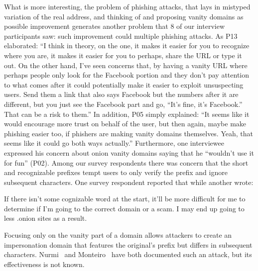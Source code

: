 What is more interesting, the problem of phishing attacks, that lays in mistyped variation of the real address, and thinking of and proposing vanity domains as possible improvement generates another problem that 8 of our interview participants saw: such improvement could multiple phishing attacks. As P13 elaborated: ``I think in theory, on the one, it makes it easier for you to recognize where you are, it makes it easier for you to perhaps, share the URL or type it out. On the other hand, I've seen concerns that, by having a vanity URL where perhaps people only look for the Facebook portion and they don't pay attention to what comes after it could potentially make it easier to exploit unsuspecting users. Send them a link that also says Facebook but the numbers after it are different, but you just see the Facebook part and go, ``It's fine, it's Facebook.'' That can be a risk to them.''  In addition, P05 simply explained:  ``It seems like it would encourage more trust on behalf of the user, but then again, maybe make phishing easier too, if phishers are making vanity domains themselves. Yeah, that seems like it could go both ways actually.'' Furthermore, one interviewee expressed his concern about onion vanity domains saying that he ``wouldn’t use it for fun'' (P02).
Among our survey respondents there was concern that the
short and recognizable prefixes tempt users to only verify the prefix and ignore
subsequent characters.  One survey respondent reported that   while another wrote:

\begin{displayquote}
If there isn't some cognizable word at the start, it'll be more difficult for me
to determine if I'm going to the correct domain or a scam. I may end up going to
less .onion sites as a result.
\end{displayquote}

Focusing only on the vanity part of a domain allows attackers to create an
impersonation domain that features the original's prefix but differs in
subsequent characters.  Nurmi~\cite{Nurmi2015a} and
Monteiro~\cite{Monteiro2016a} have both documented such an attack, but its
effectiveness is not known.

